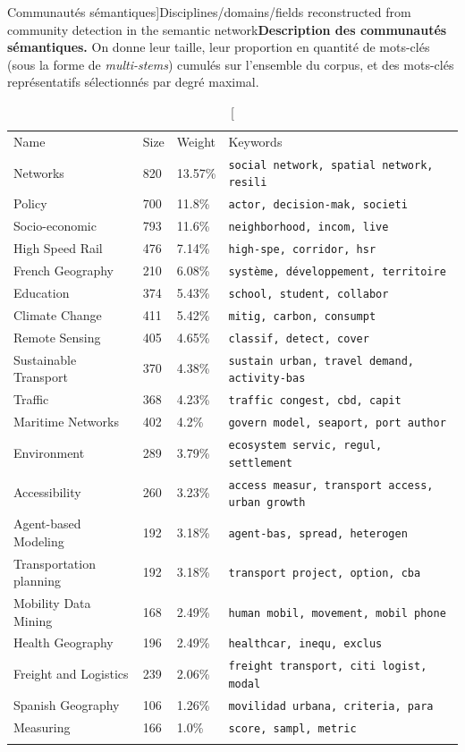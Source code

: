 \begin{table}
\caption[Semantic communities][Communautés sémantiques]{Disciplines/domains/fields reconstructed from community detection in the semantic network}{\textbf{Description des communautés sémantiques.} On donne leur taille, leur proportion en quantité de mots-clés (sous la forme de \emph{multi-stems})  cumulés sur l'ensemble du corpus, et des mots-clés représentatifs sélectionnés par degré maximal.\label{tab:quantepistemo:semanticdomains}}
\begin{tabular}{llll}
\hline\noalign{\smallskip}
Name & Size & Weight & Keywords  \\
\noalign{\smallskip}\hline\noalign{\smallskip}
Networks & 820 & 13.57\% & \texttt{social network, spatial network, resili} \\
Policy & 700 & 11.8\% & \texttt{actor, decision-mak, societi} \\
Socio-economic & 793 & 11.6\% & \texttt{neighborhood, incom, live} \\
High Speed Rail & 476 & 7.14\% & \texttt{high-spe, corridor, hsr} \\
French Geography & 210 & 6.08\% & \texttt{système, développement, territoire} \\
Education & 374 & 5.43\% & \texttt{school, student, collabor} \\
Climate Change & 411 & 5.42\% & \texttt{mitig, carbon, consumpt} \\
Remote Sensing & 405 & 4.65\% & \texttt{classif, detect, cover} \\
Sustainable Transport & 370 & 4.38\% & \texttt{sustain urban, travel demand, activity-bas} \\
Traffic & 368 & 4.23\% & \texttt{traffic congest, cbd, capit} \\
Maritime Networks & 402 & 4.2\% & \texttt{govern model, seaport, port author} \\
Environment & 289 & 3.79\% & \texttt{ecosystem servic, regul, settlement} \\
Accessibility & 260 & 3.23\% & \texttt{access measur, transport access, urban growth} \\
Agent-based Modeling & 192 & 3.18\% & \texttt{agent-bas, spread, heterogen} \\
Transportation planning & 192 & 3.18\% & \texttt{transport project, option, cba} \\
Mobility Data Mining & 168 & 2.49\% & \texttt{human mobil, movement, mobil phone} \\
Health Geography & 196 & 2.49\% & \texttt{healthcar, inequ, exclus} \\
Freight and Logistics & 239 & 2.06\% & \texttt{freight transport, citi logist, modal} \\
Spanish Geography & 106 & 1.26\% & \texttt{movilidad urbana, criteria, para} \\
Measuring & 166 & 1.0\% & \texttt{score, sampl, metric} \\
\noalign{\smallskip}\hline
\end{tabular}
\end{table}



